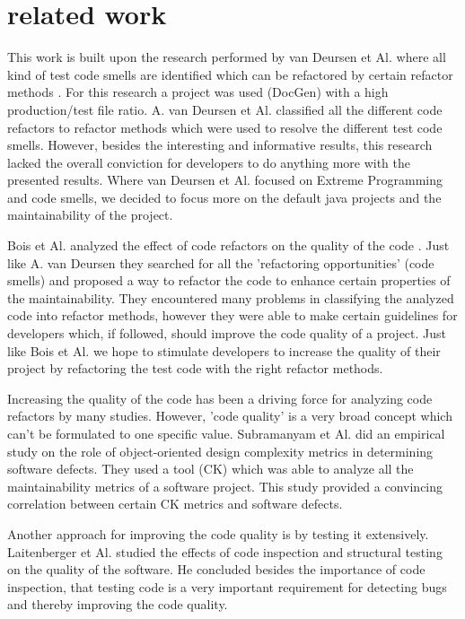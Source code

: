 \section{related work}
This work is built upon the research performed by van Deursen et Al. where all kind of test code smells are identified which can be refactored by certain refactor methods \cite{van2001refactoring}. For this research a project was used (DocGen) with a high production/test file ratio. A. van Deursen et Al. classified all the different code refactors to refactor methods which were used to resolve the different test code smells. However, besides the interesting and informative results, this research lacked the overall conviction for developers to do anything more with the presented results. Where van Deursen et Al. focused on Extreme Programming and code smells, we decided to focus more on the default java projects and the maintainability of the project. 

Bois et Al. analyzed the effect of code refactors on the quality of the code \cite{du2004refactoring}. Just like A. van Deursen they searched for all the 'refactoring opportunities' (code smells) and proposed a way to refactor the code to enhance certain properties of the maintainability. They encountered many problems in classifying the analyzed code into refactor methods, however they were able to make certain guidelines for developers which, if followed, should improve the code quality of a project. Just like Bois et Al. we hope to stimulate developers to increase the quality of their project by refactoring the test code with the right refactor methods.

Increasing the quality of the code has been a driving force for analyzing code refactors by many studies. However, 'code quality' is a very broad concept which can't be formulated to one specific value. Subramanyam et Al. \cite{subramanyam2003empirical} did an empirical study on the role of object-oriented design complexity metrics in determining software defects. They used a tool (CK) which was able to analyze all the maintainability metrics of a software project. This study provided a convincing correlation between certain CK metrics and software defects.

Another approach for improving the code quality is by testing it extensively. Laitenberger et Al. \cite{laitenberger1998studying} studied the effects of code inspection and structural testing on the quality of the software. He concluded besides the importance of code inspection, that testing code is a very important requirement for detecting bugs and thereby improving the code quality.